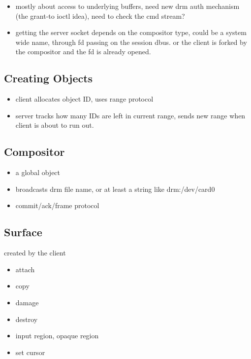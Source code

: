 \documentclass{article}
\begin{document}
\begin{itemize}
\item mostly about access to underlying buffers, need new drm auth
  mechanism (the grant-to ioctl idea), need to check the cmd stream?

\item getting the server socket depends on the compositor type, could
  be a system wide name, through fd passing on the session dbus. or
  the client is forked by the compositor and the fd is already opened.
\end{itemize}

\subsection{Creating Objects}

\begin{itemize}
\item client allocates object ID, uses range protocol
\item server tracks how many IDs are left in current range, sends new
  range when client is about to run out.
\end{itemize}

\subsection{Compositor}

\begin{itemize}
\item a global object
\item broadcasts drm file name, or at least a string like drm:/dev/card0
\item commit/ack/frame protocol
\end{itemize}

\subsection{Surface}

created by the client
\begin{itemize}
\item attach
\item copy
\item damage
\item destroy
\item input region, opaque region
\item set cursor
\end{itemize}
\end{document}
